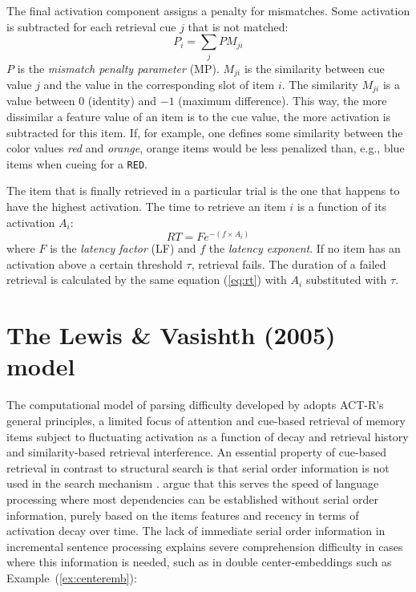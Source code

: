 \documentclass{cambridge7A}\usepackage[]{graphicx}\usepackage[]{color}
\newcommand{\actrcue}[1]{\texttt{\uppercase{#1}}}
\begin{document}
The final activation component assigns a penalty for mismatches. Some activation is subtracted for each retrieval cue $j$ that is not matched:
\begin{equation}\label{eq:pm}
	P_i = \sum_j PM_{ji}
\end{equation}
$P$ is the \textit{mismatch penalty parameter} (MP). $M_{ji}$ is the similarity between cue value $j$ and the value in the corresponding slot of item $i$. The similarity $M_{ji}$ is a value between $0$ (identity) and $-1$ (maximum difference).
This way, the more dissimilar a feature value of an item is to the cue value, the more activation is subtracted for this item.
If, for example, one defines some similarity between the color values \textit{red} and \textit{orange}, orange items would be less penalized than, e.g., blue items when cueing for a \actrcue{red}.

The item that is finally retrieved in a particular trial is the one that happens to have the highest activation. The time to retrieve an item $i$ is a function of its activation $A_i$:
\begin{equation}\label{eq:rt}
	RT = Fe^{-(f\times A_i)}
\end{equation}
where $F$ is the \textit{latency factor} (LF) and $f$ the \textit{latency exponent}. 
If no item has an activation above a certain threshold $\tau$, retrieval fails. The duration of a failed retrieval is calculated by the same equation (\ref{eq:rt}) with $A_i$ substituted with $\tau$.


\section{The Lewis \& Vasishth (2005) model}
The computational model of parsing difficulty developed by \cite{LewisVasishth2005} adopts ACT-R's general principles, a limited focus of attention and cue-based retrieval of memory items subject to fluctuating activation as a function of decay and retrieval history and similarity-based retrieval interference. An essential property of cue-based retrieval in contrast to structural search is that serial order information is not used in the search mechanism \citep{McElree2006,Ratcliff1978}. \cite{LewisVasishth2005} argue that this serves the speed of language processing where most dependencies can be established without serial order information, purely based on the items features and recency in terms of activation decay over time. The lack of immediate serial order information in incremental sentence processing  explains severe comprehension difficulty in cases where this information is needed, such as in double center-embeddings such as Example~(\ref{ex:centeremb}):
\end{document}
